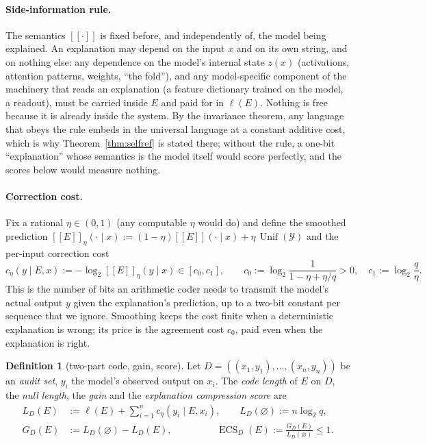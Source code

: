 \documentclass[11pt,letterpaper]{article}
\newcommand{\sem}[1]{[\![#1]\!]}
\newcommand{\Y}{\mathcal{Y}}
\newcommand{\D}{D}
\DeclareMathOperator{\ECS}{ECS}
\DeclareMathOperator{\Unif}{Unif}
\newcommand{\cz}{c_{0}}
\newcommand{\co}{c_{1}}
\newcommand{\Ltwo}{\log_{2}}
\theoremstyle{plain}
\theoremstyle{definition}
\newtheorem{definition}{Definition}
\theoremstyle{remark}
\begin{document}
\paragraph{Side-information rule.} The semantics $\sem{\cdot}$ is fixed before, and independently of, the model being explained. An explanation may depend on the input $x$ and on its own string, and on nothing else: any dependence on the model's internal state $z(x)$ (activations, attention patterns, weights, ``the fold''), and any model-specific component of the machinery that reads an explanation (a feature dictionary trained on the model, a readout), must be carried inside $E$ and paid for in $\ell(E)$. Nothing is free because it is already inside the system. By the invariance theorem, any language that obeys the rule embeds in the universal language at a constant additive cost, which is why Theorem~\ref{thm:selfref} is stated there; without the rule, a one-bit ``explanation'' whose semantics is the model itself would score perfectly, and the scores below would measure nothing.

\paragraph{Correction cost.} Fix a rational $\eta\in(0,1)$ (any computable $\eta$ would do) and define the smoothed prediction $\sem{E}_{\eta}(\cdot\mid x):=(1-\eta)\sem{E}(\cdot\mid x)+\eta\,\Unif(\Y)$ and the per-input correction cost
\begin{equation}
c_{\eta}(y\mid E,x) := -\Ltwo \sem{E}_{\eta}(y\mid x)\in[\cz,\co],\qquad
\cz:=\Ltwo\frac{1}{1-\eta+\eta/q}>0,\quad \co:=\Ltwo\frac{q}{\eta}.
\label{eq:cost}
\end{equation}
This is the number of bits an arithmetic coder needs to transmit the model's actual output $y$ given the explanation's prediction, up to a two-bit constant per sequence that we ignore. Smoothing keeps the cost finite when a deterministic explanation is wrong; its price is the agreement cost $\cz$, paid even when the explanation is right.

\begin{definition}[two-part code, gain, score]
\label{def:ecs}
Let $\D=((x_1,y_1),\dots,(x_n,y_n))$ be an \emph{audit set}, $y_i$ the model's observed output on $x_i$. The \emph{code length} of $E$ on $\D$, the \emph{null length}, the \emph{gain} and the \emph{explanation compression score} are
\begin{align}
L_{\D}(E) &:= \ell(E)+\sum_{i=1}^{n}c_{\eta}(y_i\mid E,x_i),\qquad
L_{\D}(\varnothing):=n\Ltwo q,\\
G_{\D}(E) &:= L_{\D}(\varnothing)-L_{\D}(E),\qquad\qquad\ \ \,
\ECS_{\D}(E):=\frac{G_{\D}(E)}{L_{\D}(\varnothing)}\le 1.
\end{align}
\end{definition}
\end{document}

